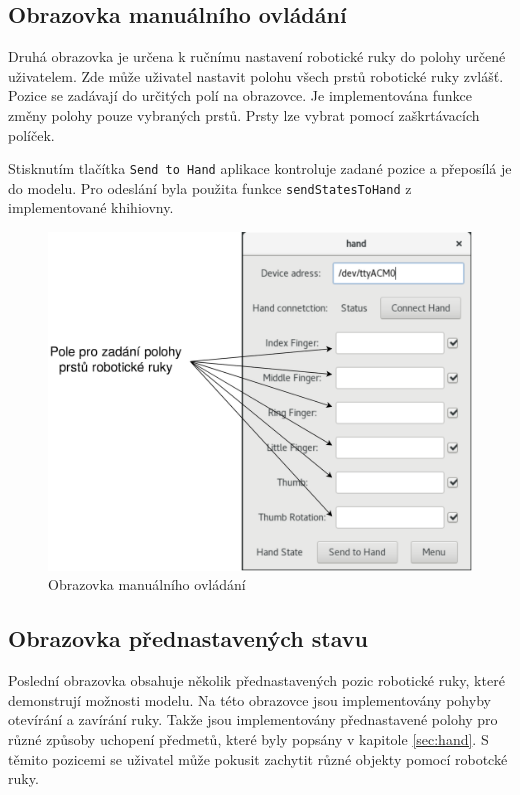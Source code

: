 \documentclass[thesis=B,czech]{FITthesis}[2012/06/26]
\begin{document}
\newpage

\subsection{Obrazovka manuálního ovládání}


Druhá obrazovka je určena k ručnímu nastavení robotické ruky do polohy určené uživatelem. Zde může uživatel nastavit polohu všech prstů robotické ruky zvlášť. Pozice se zadávají do určitých polí na obrazovce. Je implementována funkce změny polohy pouze vybraných prstů. Prsty lze vybrat pomocí zaškrtávacích políček.

Stisknutím tlačítka \texttt{Send to Hand} aplikace kontroluje zadané pozice a přeposílá je do modelu. Pro odeslání byla použita funkce \texttt{sendStatesToHand} z implementované khihiovny. 


 \begin{figure}[H]
\centering
\includegraphics[scale=0.22]{./image/AppScreen2.png}
\caption{Obrazovka manuálního ovládání}
\label{fig:AppScreen2}
\end{figure} 

\newpage

\subsection{Obrazovka přednastavených stavu}

Poslední obrazovka obsahuje několik přednastavených pozic robotické ruky, které demonstrují možnosti modelu. Na této obrazovce jsou implementovány pohyby otevírání a zavírání ruky. Takže jsou implementovány přednastavené polohy pro různé způsoby uchopení předmetů, které byly popsány v kapitole \ref{sec:hand}. S těmito pozicemi se uživatel může pokusit zachytit různé objekty pomocí robotcké ruky. 
\end{document}
